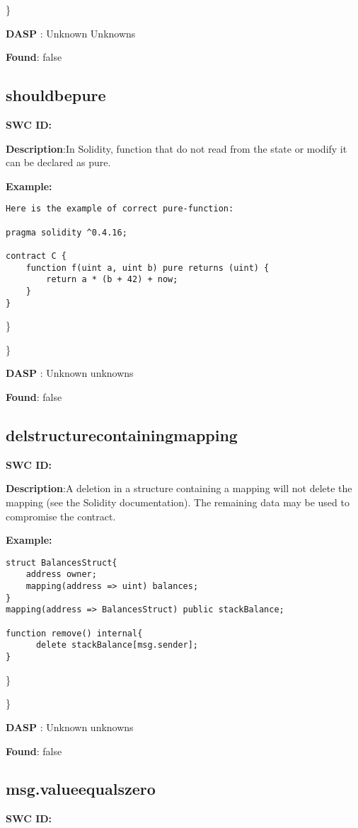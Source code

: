 \documentclass{article}
\begin{document}
\} 

\textbf{DASP} : Unknown Unknowns

\textbf{Found}: false

\subsection{should\textunderscore be\textunderscore pure} 
\textbf{SWC \textunderscore ID:} 

\textbf{Description}:In Solidity, function that do not read from the state or modify it can be declared as pure.


\textbf{Example:} 
\begin{verbatim}
Here is the example of correct pure-function:

pragma solidity ^0.4.16;

contract C {
    function f(uint a, uint b) pure returns (uint) {
        return a * (b + 42) + now;
    }
}

\end{verbatim}\} 

\} 

\textbf{DASP} : Unknown unknowns

\textbf{Found}: false

\subsection{del\textunderscore structure\textunderscore containing\textunderscore mapping} 
\textbf{SWC \textunderscore ID:} 

\textbf{Description}:A deletion in a structure containing a mapping will not delete the mapping (see the Solidity documentation). The remaining data may be used to compromise the contract.


\textbf{Example:} 
\begin{verbatim}
struct BalancesStruct{
    address owner;
    mapping(address => uint) balances;
}
mapping(address => BalancesStruct) public stackBalance;

function remove() internal{
      delete stackBalance[msg.sender];
}

\end{verbatim}\} 

\} 

\textbf{DASP} : Unknown unknowns

\textbf{Found}: false

\subsection{msg.value\textunderscore equals\textunderscore zero} 
\textbf{SWC \textunderscore ID:} 
\end{document}
